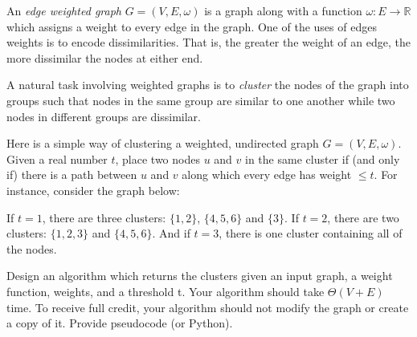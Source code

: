 \begin{prob}

    An \emph{edge weighted graph} $G = (V,E,\omega)$ is a graph along with
        a function $\omega : E \to \mathbb R$ which assigns a weight to every
        edge in the graph. One of the uses of edges weights is to encode dissimilarities.
        That is, the greater the weight of an edge, the more dissimilar the nodes
        at either end.

        A natural task involving weighted graphs is to \emph{cluster} the nodes
        of the graph into groups such that nodes in the same group are similar to
        one another while two nodes in different groups are dissimilar.

        Here is a simple way of clustering a weighted, undirected graph $G =
        (V,E,\omega)$.  Given a real number $t$, place two nodes $u$ and $v$ in
        the same cluster if (and only if) there is a path between $u$ and $v$
        along which every edge has weight $\leq t$. For instance, consider the graph below:

        \noindent
        \begin{minipage}{0.5\textwidth}
        \centering
        \end{minipage}%
        \begin{minipage}{0.5\textwidth}
        If $t = 1$, there are three clusters: $\{1, 2\}$, $\{4, 5, 6\}$ and $\{3\}$.
        If $t = 2$, there are two clusters: $\{1, 2, 3\}$ and $\{4, 5, 6\}$.
        And if $t = 3$, there is one cluster containing all of the nodes.
        \end{minipage}

        Design an algorithm which returns the clusters given an input graph, a weight function, weights, and a threshold t.
        Your algorithm should take $\Theta(V + E)$ time. To receive full credit, your algorithm should not modify the graph or create a copy of it.
        Provide pseudocode (or Python).

    \begin{soln}
        \inputminted{python}{\thisdir/include/cluster_answer.py}
    \end{soln}

\end{prob}
